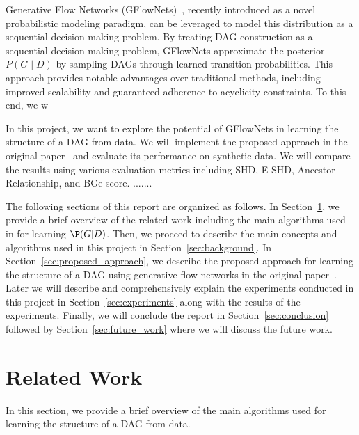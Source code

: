 \documentclass{lxaiproposal}
\begin{document}
    Generative Flow Networks (GFlowNets)~\cite{bengio2023gflownetfoundations}, recently introduced as a novel
    probabilistic modeling paradigm, can be leveraged to model this distribution as a sequential decision-making
    problem. By treating DAG construction as a sequential decision-making problem, GFlowNets approximate the
    posterior $P(G\mid D)$ by sampling DAGs through learned transition probabilities. This approach provides notable
    advantages over traditional methods, including improved scalability and guaranteed adherence to acyclicity
    constraints. To this end, we w

    In this project, we want to explore the potential of GFlowNets in learning the structure of a DAG from data. We
    will implement the proposed approach in the original paper~\cite{deleu2022daggflownet} and evaluate its performance
    on synthetic data. We will compare the results using various evaluation metrics including SHD, E-SHD, Ancestor
    Relationship, and BGe score.
    .......

    The following sections of this report are organized as follows. In Section~\ref{sec:related_work}, we provide a
    brief overview of the related work including the main algorithms used in for learning $\P(G|D)$. Then, we proceed
    to describe the main concepts and algorithms used in this project in Section~\ref{sec:background}. In Section~\ref{sec:proposed_approach},
    we describe the proposed approach for learning the structure of a DAG using generative flow networks in the
    original paper~\cite{deleu2022daggflownet}. Later we will describe and comprehensively explain the experiments
    conducted in this project in Section~\ref{sec:experiments} along with the results of the
    experiments. Finally, we will conclude the report in Section~\ref{sec:conclusion}
    followed by Section~\ref{sec:future_work} where we will discuss the future work.


    \section{Related Work}\label{sec:related_work}
    \vspace*{-3mm}

    In this section, we provide a brief overview of the main algorithms used for learning the structure of a DAG from
    data.
\end{document}
